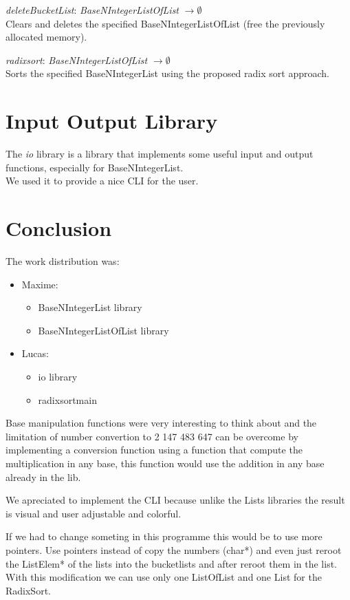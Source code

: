 \documentclass[book, backcover, english, nodocumentinfo]{upmethodology-document}
\begin{document}
		\begin{minipage}{\linewidth}
			\textit{deleteBucketList}: \textit{BaseNIntegerListOfList} $\rightarrow \emptyset$\\
			Clears and deletes the specified BaseNIntegerListOfList (free the previously allocated memory).
			\label{algo:BNIL-DeleteBucketList}
			
		\end{minipage}
		\nxtalgo{}

		\begin{minipage}{\linewidth}
			\textit{radixsort}: \textit{BaseNIntegerListOfList} $\rightarrow \emptyset$\\
			Sorts the specified BaseNIntegerList using the proposed radix sort approach.
			\label{algo:BNIL-RadixSort}
			
		\end{minipage}
		\nxtalgo{}

\chapter{Input Output Library} \label{chapter:IO-Lib}
	The \textit{io} library is a library that implements some useful input and output functions, especially for BaseNIntegerList.\\
	We used it to provide a nice CLI for the user.\\
\chapter{Conclusion} \label{chapter:Conclusion}
	The work distribution was:
	\begin{itemize}
		\item{} Maxime:
			\begin{itemize}
				\item{} BaseNIntegerList library
				\item{} BaseNIntegerListOfList library
			\end{itemize}
		\item{} Lucas:
			\begin{itemize}
				\item{} io library
				\item{} radixsortmain
			\end{itemize}
	\end{itemize}
	Base manipulation functions were very interesting to think about and the limitation of number convertion to 2 147 483 647 can be overcome by implementing a conversion function using a function that compute the multiplication in any base, this function would use the addition in any base already in the lib.

	We apreciated to implement the CLI because unlike the Lists libraries the result is visual and user adjustable and colorful. 

	If we had to change someting in this programme this would be to use more pointers.
	Use pointers instead of copy the numbers (char*) and even just reroot the ListElem* of the lists into the bucketlists and after reroot them in the list. With this modification we can use only one ListOfList and one List for the RadixSort.
\end{document}
